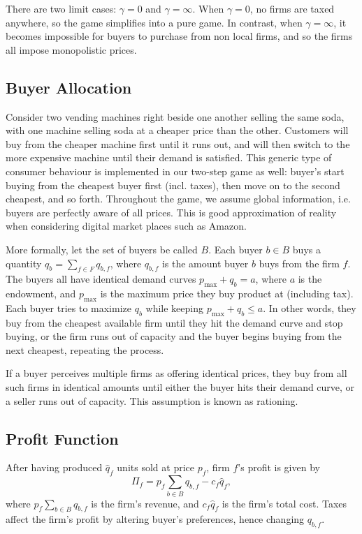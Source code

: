 \documentclass[final,3p,times,authoryear,12pt]{elsarticle}
\begin{document}
There are two limit cases: $\gamma=0$ and $\gamma=\infty$. 
When $\gamma = 0$, no firms are taxed anywhere, so the game simplifies into a pure \cite{kreps1983quantity} game.
In contrast, when $\gamma = \infty$, it becomes impossible for buyers to purchase from non local firms, and so the firms all impose monopolistic prices.

\subsection{Buyer Allocation} 

Consider two vending machines right beside one another selling the same soda, with one machine selling soda at a cheaper price than the other. 
Customers will buy from the cheaper machine first until it runs out, and will then switch to the more expensive machine until their demand is satisfied. 
This generic type of consumer behaviour is implemented in our two-step game as well: 
buyer's start buying from the cheapest buyer first (incl. taxes), then move on to the second cheapest, and so forth. 
Throughout the game, we assume global information, i.e. buyers are perfectly aware of all prices. 
This is good approximation of reality when considering digital market places such as Amazon. 

More formally, let the set of buyers be called $B$. 
Each buyer $b\in B$ buys a quantity $q_b =\sum_{f\in F} q_{b,f}$, where $q_{b,f}$ is the amount buyer $b$ buys from the firm $f$. 
The buyers all have identical demand curves $p_\text{max} + q_b = a$, where $a$ is the endowment, and $p_\text{max}$ is the maximum price they buy product at (including tax). 
Each buyer tries to maximize $q_b$ while keeping $p_\text{max} + q_b \le a$. 
In other words, they buy from the cheapest available firm until they hit the demand curve and stop buying, or the firm runs out of capacity and the buyer begins buying from the next cheapest, repeating the process.

If a buyer perceives multiple firms as offering identical prices, they buy from
all such firms in identical amounts until either the buyer hits their demand
curve, or a seller runs out of capacity. 
This assumption is known as rationing. 

\subsection{Profit Function}
After having produced $\hat q_f$ units sold at price $p_f$, firm $f$'s profit is given by 
\begin{equation}
    \Pi_f = p_f \sum_{b\in B} q_{b,f} - c_f\hat q_f,
\end{equation} 
where  $p_f \sum_{b\in B} q_{b,f}$ is the firm's revenue, and $ c_f\hat q_f$ is the firm's total cost.
Taxes affect the firm's profit by altering buyer's preferences, hence changing $q_{b,f}$.
\end{document}
